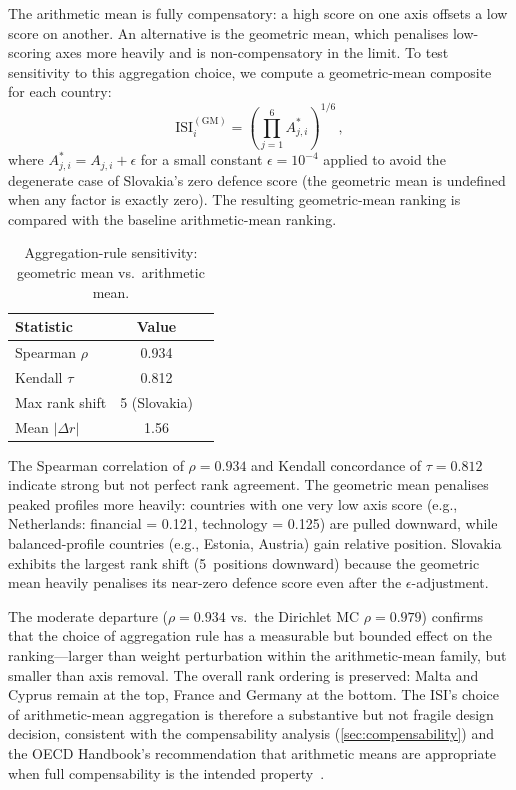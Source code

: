 The arithmetic mean is fully compensatory: a high score on one axis
offsets a low score on another.  An alternative is the geometric
mean, which penalises low-scoring axes more heavily and is
non-compensatory in the limit.  To test sensitivity to this
aggregation choice, we compute a geometric-mean composite for each
country:
\begin{equation}\label{eq:geometric-mean}
  \text{ISI}_i^{(\text{GM})}
  = \left(\prod_{j=1}^{6} A_{j,i}^{*}\right)^{1/6}\,,
\end{equation}
where $A_{j,i}^{*} = A_{j,i} + \epsilon$ for a small constant
$\epsilon = 10^{-4}$ applied to avoid the degenerate case of
Slovakia's zero defence score (the geometric mean is undefined
when any factor is exactly zero).  The resulting geometric-mean
ranking is compared with the baseline arithmetic-mean ranking.

\begin{table}[htbp]
\centering
\caption{Aggregation-rule sensitivity: geometric mean vs.\ arithmetic
  mean.}
\label{tab:geometric-mean}
\small
\begin{tabular}{@{}lS[table-format=1.3,round-precision=3]S[table-format=1.3,round-precision=3]@{}}
\toprule
\textbf{Statistic} & {\textbf{Value}} \\
\midrule
Spearman $\rho$    & 0.934 \\
Kendall $\tau$     & 0.812 \\
Max rank shift     & {5 (Slovakia)} \\
Mean $|\Delta r|$  & 1.56 \\
\bottomrule
\end{tabular}
\end{table}

The Spearman correlation of $\rho = 0.934$ and Kendall concordance
of $\tau = 0.812$ indicate strong but not perfect rank agreement.
The geometric mean penalises peaked profiles more heavily: countries
with one very low axis score (e.g., Netherlands: financial = 0.121,
technology = 0.125) are pulled downward, while balanced-profile
countries (e.g., Estonia, Austria) gain relative position.  Slovakia
exhibits the largest rank shift (5~positions downward) because the
geometric mean heavily penalises its near-zero defence score even
after the $\epsilon$-adjustment.

The moderate departure ($\rho = 0.934$ vs.\ the Dirichlet MC
$\rho = 0.979$) confirms that the choice of aggregation rule has a
measurable but bounded effect on the ranking---larger than weight
perturbation within the arithmetic-mean family, but smaller than
axis removal.  The overall rank ordering is preserved: Malta and
Cyprus remain at the top, France and Germany at the bottom.  The
ISI's choice of arithmetic-mean aggregation is therefore a
substantive but not fragile design decision, consistent with the
compensability analysis (\cref{sec:compensability}) and the OECD
Handbook's recommendation that arithmetic means are appropriate
when full compensability is the intended
property~\cite{oecd_handbook_2008}.

